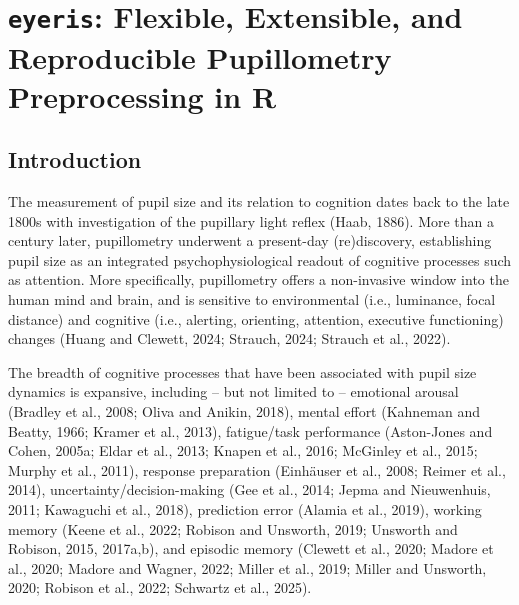 \chapter{\texttt{eyeris}: Flexible, Extensible, and Reproducible Pupillometry Preprocessing in R}

\section{Introduction}
The measurement of pupil size and its relation to cognition dates back to the late 1800s with investigation of the pupillary light reflex (Haab, 1886). More than a century later, pupillometry underwent a present-day (re)discovery, establishing pupil size as an integrated psychophysiological readout of cognitive processes such as attention. More specifically, pupillometry offers a non-invasive window into the human mind and brain, and is sensitive to environmental (i.e., luminance, focal distance) and cognitive (i.e., alerting, orienting, attention, executive functioning) changes (Huang and Clewett, 2024; Strauch, 2024; Strauch et al., 2022).

The breadth of cognitive processes that have been associated with pupil size dynamics is expansive, including – but not limited to – emotional arousal (Bradley et al., 2008; Oliva and Anikin, 2018), mental effort (Kahneman and Beatty, 1966; Kramer et al., 2013), fatigue/task performance (Aston-Jones and Cohen, 2005a; Eldar et al., 2013; Knapen et al., 2016; McGinley et al., 2015; Murphy et al., 2011), response preparation (Einhäuser et al., 2008; Reimer et al., 2014), uncertainty/decision-making (Gee et al., 2014; Jepma and Nieuwenhuis, 2011; Kawaguchi et al., 2018), prediction error (Alamia et al., 2019), working memory (Keene et al., 2022; Robison and Unsworth, 2019; Unsworth and Robison, 2015, 2017a,b), and episodic memory (Clewett et al., 2020; Madore et al., 2020; Madore and Wagner, 2022; Miller et al., 2019; Miller and Unsworth, 2020; Robison et al., 2022; Schwartz et al., 2025).

